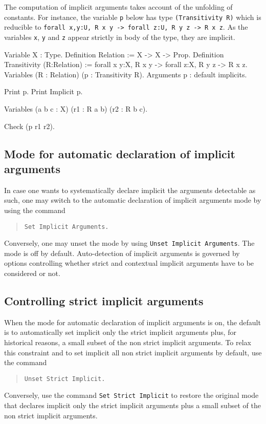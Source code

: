 The computation of implicit arguments takes account of the
unfolding of constants.  For instance, the variable {\tt p} below has
type {\tt (Transitivity R)} which is reducible to {\tt forall x,y:U, R x
y -> forall z:U, R y z -> R x z}. As the variables {\tt x}, {\tt y} and
{\tt z} appear strictly in body of the type, they are implicit.

\begin{coq_example*}
Variable X : Type.
Definition Relation := X -> X -> Prop.
Definition Transitivity (R:Relation) :=
  forall x y:X, R x y -> forall z:X, R y z -> R x z.
Variables (R : Relation) (p : Transitivity R).
Arguments p : default implicits.
\end{coq_example*}
\begin{coq_example}
Print p.
Print Implicit p.
\end{coq_example}
\begin{coq_example*}
Variables (a b c : X) (r1 : R a b) (r2 : R b c).
\end{coq_example*}
\begin{coq_example}
Check (p r1 r2).
\end{coq_example}

\subsection{Mode for automatic declaration of implicit arguments
\label{Auto-implicit}
}

In case one wants to systematically declare implicit the arguments
detectable as such, one may switch to the automatic declaration of
implicit arguments mode by using the command
\begin{quote}
\tt Set Implicit Arguments.
\end{quote}
Conversely, one may unset the mode by using {\tt Unset Implicit
Arguments}.  The mode is off by default. Auto-detection of implicit
arguments is governed by options controlling whether strict and
contextual implicit arguments have to be considered or not.

\subsection{Controlling strict implicit arguments
\label{SetStrictImplicit}}

When the mode for automatic declaration of implicit arguments is on,
the default is to automatically set implicit only the strict implicit
arguments plus, for historical reasons, a small subset of the non
strict implicit arguments. To relax this constraint and to
set implicit all non strict implicit arguments by default, use the command
\begin{quote}
\tt Unset Strict Implicit.
\end{quote}
Conversely, use the command {\tt Set Strict Implicit} to
restore the original mode that declares implicit only the strict implicit arguments plus a small subset of the non strict implicit arguments.

